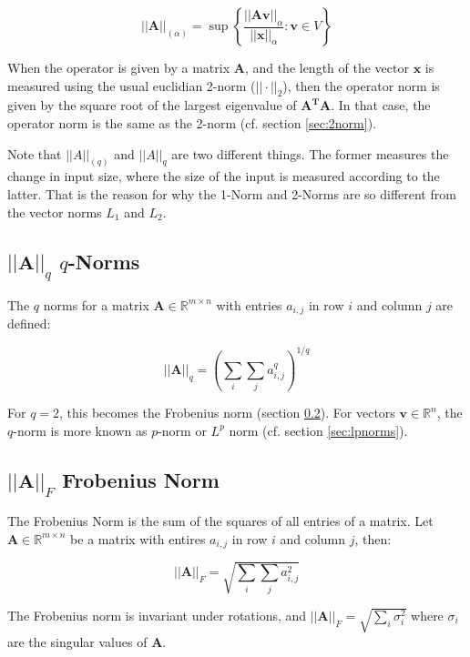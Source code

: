 \begin{equation}
||\mathbf{A}||_{(\alpha)} = \sup\left\{\frac{||\mathbf{A}\mathbf{v}||_{\alpha}}{||\mathbf{x}||_{\alpha}}: \mathbf{v} \in V\right\}
\end{equation}

When the operator is given by a matrix $\mathbf{A}$, and the length of the vector $\mathbf{x}$ is measured using the usual euclidian 2-norm ($||\cdot||_{2}$), then the operator norm is given by the square root of the largest eigenvalue of $\mathbf{A^T A}$. In that case, the operator norm is the same as the 2-norm (cf. section \ref{sec:2norm}).

Note that $||A||_{(q)}$ and $||A||_q$ are two different things. The former measures the change in input size, where the size of the input is measured according to the latter. That is the reason for why the 1-Norm and 2-Norms are so different from the vector norms $L_1$ and $L_2$.


\subsection{$||\mathbf{A}||_q$ $q$-Norms}
\label{sec:qnorms}

The $q$ norms for a matrix $\mathbf{A} \in \mathbb{R}^{m\times n}$ with entries $a_{i,j}$ in row $i$ and column $j$ are defined:

\begin{equation}
||\mathbf{A}||_q = \left(\sum_{i}\sum_{j} a^q_{i,j}\right)^{1/q}
\end{equation}

For $q=2$, this becomes the Frobenius norm (section \ref{sec:frobenius}). For vectors $\mathbf{v}\in\mathbb{R}^{n}$, the $q$-norm is more known as $p$-norm or $L^p$ norm (cf. section \ref{sec:lpnorms}). 

\subsection{$||\mathbf{A}||_F$ Frobenius Norm}
\label{sec:frobenius}
The Frobenius Norm is the sum of the squares of all entries of a matrix. Let $\mathbf{A} \in \mathbb{R}^{m\times n}$ be a matrix with entires $a_{i,j}$ in row $i$ and column $j$, then:

\begin{equation}
||\mathbf{A}||_F = \sqrt{\sum_{i}\sum_{j} a^2_{i,j}}
\end{equation}

The Frobenius norm is invariant under rotations, and $||\mathbf{A}||_F = \sqrt{\sum_i \sigma_i^2}$ where $\sigma_i$ are the singular values of $\mathbf{A}$. 


